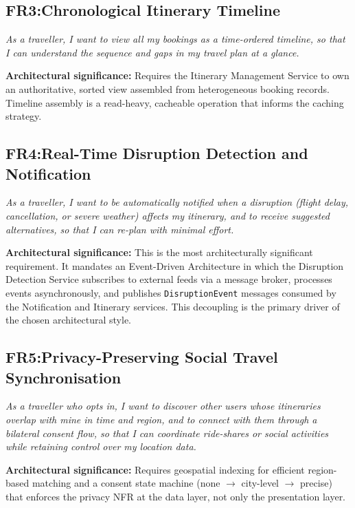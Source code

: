 \documentclass[12pt,a4paper]{article}
\begin{document}
\subsection{FR3:Chronological Itinerary Timeline}

\textit{As a traveller, I want to view all my bookings as a time-ordered timeline, so that I can
understand the sequence and gaps in my travel plan at a glance.}

\textbf{Architectural significance:} Requires the Itinerary Management Service to own an
authoritative, sorted view assembled from heterogeneous booking records. Timeline assembly is a
read-heavy, cacheable operation that informs the caching strategy.

\subsection{FR4:Real-Time Disruption Detection and Notification}

\textit{As a traveller, I want to be automatically notified when a disruption (flight delay,
cancellation, or severe weather) affects my itinerary, and to receive suggested alternatives, so
that I can re-plan with minimal effort.}

\textbf{Architectural significance:} This is the most architecturally significant requirement. It
mandates an Event-Driven Architecture in which the Disruption Detection Service subscribes to
external feeds via a message broker, processes events asynchronously, and publishes
\texttt{DisruptionEvent} messages consumed by the Notification and Itinerary services. This
decoupling is the primary driver of the chosen architectural style.

\subsection{FR5:Privacy-Preserving Social Travel Synchronisation}

\textit{As a traveller who opts in, I want to discover other users whose itineraries overlap with
mine in time and region, and to connect with them through a bilateral consent flow, so that I can
coordinate ride-shares or social activities while retaining control over my location data.}

\textbf{Architectural significance:} Requires geospatial indexing for efficient region-based
matching and a consent state machine (none $\to$ city-level $\to$ precise) that enforces the
privacy NFR at the data layer, not only the presentation layer.
\end{document}

